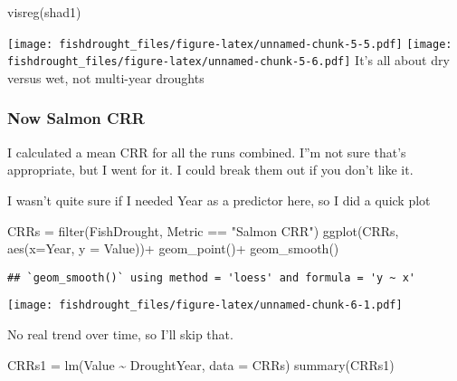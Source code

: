 \documentclass[
]{article}
\newenvironment{Shaded}{\begin{snugshade}}{\end{snugshade}}
\newcommand{\AttributeTok}[1]{\textcolor[rgb]{0.77,0.63,0.00}{#1}}
\newcommand{\FunctionTok}[1]{\textcolor[rgb]{0.00,0.00,0.00}{#1}}
\newcommand{\NormalTok}[1]{#1}
\newcommand{\OtherTok}[1]{\textcolor[rgb]{0.56,0.35,0.01}{#1}}
\newcommand{\SpecialCharTok}[1]{\textcolor[rgb]{0.00,0.00,0.00}{#1}}
\newcommand{\StringTok}[1]{\textcolor[rgb]{0.31,0.60,0.02}{#1}}
\begin{document}
\begin{Shaded}
\begin{Highlighting}[]
\FunctionTok{visreg}\NormalTok{(shad1)}
\end{Highlighting}
\end{Shaded}

\texttt{[image: fishdrought\_files/figure-latex/unnamed-chunk-5-5.pdf]}
\texttt{[image: fishdrought\_files/figure-latex/unnamed-chunk-5-6.pdf]}
It's all about dry versus wet, not multi-year droughts

\hypertarget{now-salmon-crr}{%
\subsubsection{Now Salmon CRR}\label{now-salmon-crr}}

I calculated a mean CRR for all the runs combined. I''m not sure that's
appropriate, but I went for it. I could break them out if you don't like
it.

I wasn't quite sure if I needed Year as a predictor here, so I did a
quick plot

\begin{Shaded}
\begin{Highlighting}[]
\NormalTok{CRRs }\OtherTok{=} \FunctionTok{filter}\NormalTok{(FishDrought, Metric }\SpecialCharTok{==} \StringTok{"Salmon CRR"}\NormalTok{)}
\FunctionTok{ggplot}\NormalTok{(CRRs, }\FunctionTok{aes}\NormalTok{(}\AttributeTok{x=}\NormalTok{Year, }\AttributeTok{y =}\NormalTok{ Value))}\SpecialCharTok{+} \FunctionTok{geom\_point}\NormalTok{()}\SpecialCharTok{+} \FunctionTok{geom\_smooth}\NormalTok{()}
\end{Highlighting}
\end{Shaded}

\begin{verbatim}
## `geom_smooth()` using method = 'loess' and formula = 'y ~ x'
\end{verbatim}

\texttt{[image: fishdrought\_files/figure-latex/unnamed-chunk-6-1.pdf]}

No real trend over time, so I'll skip that.

\begin{Shaded}
\begin{Highlighting}[]
\NormalTok{CRRs1 }\OtherTok{=} \FunctionTok{lm}\NormalTok{(Value }\SpecialCharTok{\textasciitilde{}}\NormalTok{ DroughtYear, }\AttributeTok{data =}\NormalTok{ CRRs)}
\FunctionTok{summary}\NormalTok{(CRRs1)}
\end{Highlighting}
\end{Shaded}
\end{document}
